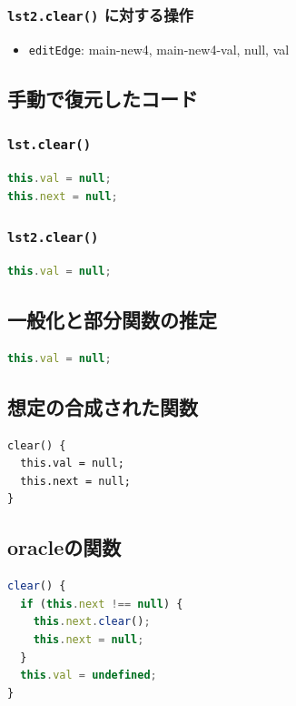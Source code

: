 \documentclass{article}
\begin{document}
\subsubsection{\texttt{lst2.clear()} に対する操作}
\begin{itemize}
  \item \texttt{editEdge}: main-new4, main-new4-val, null, val
\end{itemize}

\subsection{手動で復元したコード}

\subsubsection{\texttt{lst.clear()}}
\begin{lstlisting}[language=JavaScript]
this.val = null;
this.next = null;
\end{lstlisting}

\subsubsection{\texttt{lst2.clear()}}
\begin{lstlisting}[language=JavaScript]
this.val = null;
\end{lstlisting}

\subsection{一般化と部分関数の推定}

\begin{lstlisting}[language=JavaScript]
this.val = null;
\end{lstlisting}

\subsection{想定の合成された関数}
\begin{lstlisting}
clear() {
  this.val = null;
  this.next = null;
}
\end{lstlisting}

\subsection{oracleの関数}
\begin{lstlisting}[language=JavaScript]
clear() {
  if (this.next !== null) {
    this.next.clear();
    this.next = null;
  }
  this.val = undefined; 
}
\end{lstlisting}
\end{document}
